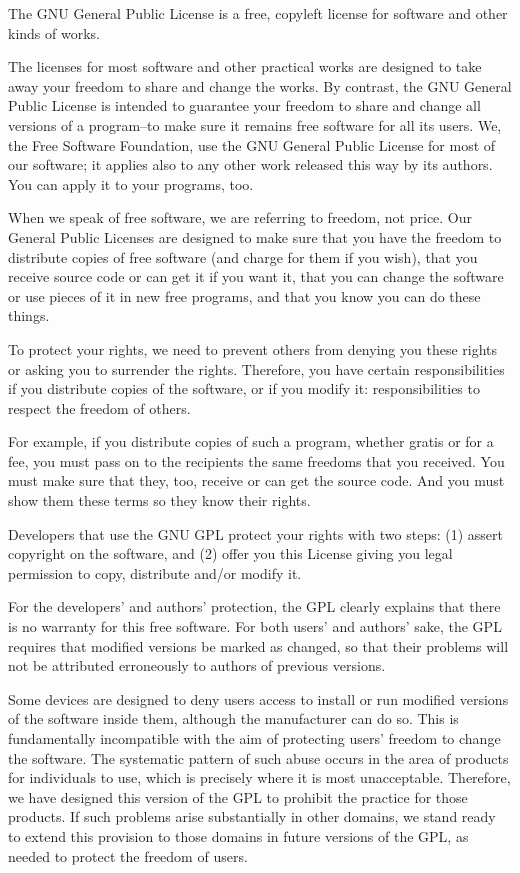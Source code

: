 \documentclass[10pt,english]{article}
\begin{document}
The GNU General Public License is a free, copyleft license for software
and other kinds of works.

The licenses for most software and other practical works are designed
to take away your freedom to share and change the works. By contrast,
the GNU General Public License is intended to guarantee your freedom
to share and change all versions of a program--to make sure it remains
free software for all its users. We, the Free Software Foundation,
use the GNU General Public License for most of our software; it applies
also to any other work released this way by its authors. You can apply
it to your programs, too.

When we speak of free software, we are referring to freedom, not price.
Our General Public Licenses are designed to make sure that you have
the freedom to distribute copies of free software (and charge for
them if you wish), that you receive source code or can get it if you
want it, that you can change the software or use pieces of it in new
free programs, and that you know you can do these things.

To protect your rights, we need to prevent others from denying you
these rights or asking you to surrender the rights. Therefore, you
have certain responsibilities if you distribute copies of the software,
or if you modify it: responsibilities to respect the freedom of others.

For example, if you distribute copies of such a program, whether gratis
or for a fee, you must pass on to the recipients the same freedoms
that you received. You must make sure that they, too, receive or can
get the source code. And you must show them these terms so they know
their rights.

Developers that use the GNU GPL protect your rights with two steps:
(1) assert copyright on the software, and (2) offer you this License
giving you legal permission to copy, distribute and/or modify it.

For the developers' and authors' protection, the GPL clearly explains
that there is no warranty for this free software. For both users'
and authors' sake, the GPL requires that modified versions be marked
as changed, so that their problems will not be attributed erroneously
to authors of previous versions.

Some devices are designed to deny users access to install or run modified
versions of the software inside them, although the manufacturer can
do so. This is fundamentally incompatible with the aim of protecting
users' freedom to change the software. The systematic pattern of such
abuse occurs in the area of products for individuals to use, which
is precisely where it is most unacceptable. Therefore, we have designed
this version of the GPL to prohibit the practice for those products.
If such problems arise substantially in other domains, we stand ready
to extend this provision to those domains in future versions of the
GPL, as needed to protect the freedom of users.
\end{document}

